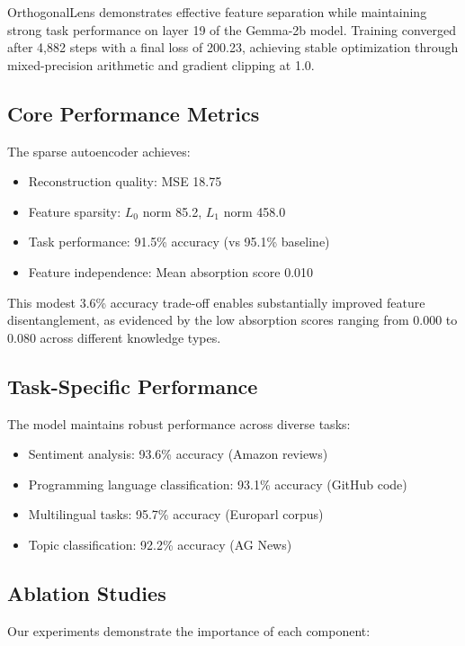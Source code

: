 \documentclass{article} %
\begin{document}
OrthogonalLens demonstrates effective feature separation while maintaining strong task performance on layer 19 of the Gemma-2b model. Training converged after 4,882 steps with a final loss of 200.23, achieving stable optimization through mixed-precision arithmetic and gradient clipping at 1.0.

\subsection{Core Performance Metrics}

The sparse autoencoder achieves:
\begin{itemize}
    \item Reconstruction quality: MSE 18.75
    \item Feature sparsity: $L_0$ norm 85.2, $L_1$ norm 458.0
    \item Task performance: 91.5\% accuracy (vs 95.1\% baseline)
    \item Feature independence: Mean absorption score 0.010
\end{itemize}

This modest 3.6\% accuracy trade-off enables substantially improved feature disentanglement, as evidenced by the low absorption scores ranging from 0.000 to 0.080 across different knowledge types.

\subsection{Task-Specific Performance}

The model maintains robust performance across diverse tasks:
\begin{itemize}
    \item Sentiment analysis: 93.6\% accuracy (Amazon reviews)
    \item Programming language classification: 93.1\% accuracy (GitHub code)
    \item Multilingual tasks: 95.7\% accuracy (Europarl corpus)
    \item Topic classification: 92.2\% accuracy (AG News)
\end{itemize}

\subsection{Ablation Studies}

Our experiments demonstrate the importance of each component:
\end{document}
